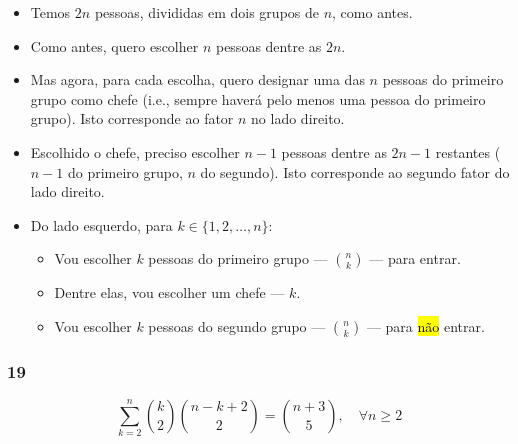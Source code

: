 \documentclass[
  11pt]{report}
\begin{document}
\begin{itemize}
\item
  Temos $2n$ pessoas, divididas em dois grupos de $n$, como antes.
\item
  Como antes, quero escolher $n$ pessoas dentre as $2n$.
\item
  Mas agora, para cada escolha, quero designar uma das $n$ pessoas do primeiro grupo como chefe (i.e., sempre haverá pelo menos uma pessoa do primeiro grupo). Isto corresponde ao fator $n$ no lado direito.
\item
  Escolhido o chefe, preciso escolher $n - 1$ pessoas dentre as $2n - 1$ restantes ($n - 1$ do primeiro grupo, $n$ do segundo). Isto corresponde ao segundo fator do lado direito.
\item
  Do lado esquerdo, para $k \in \{1, 2, \ldots, n \}$:

  \begin{itemize}
  \item
    Vou escolher $k$ pessoas do primeiro grupo --- $\binom{n}{k}$ --- para entrar.
  \item
    Dentre elas, vou escolher um chefe --- $k$.
  \item
    Vou escolher $k$ pessoas do segundo grupo --- $\binom{n}{k}$ --- para {\hl{não}} entrar.
  \end{itemize}
\end{itemize}

\hypertarget{section-3}{%
\subsubsection*{19}\label{section-3}}

\begin{rmdbox}
\[
\sum_{k=2}^n \binom k2 \binom{n-k+2}{2} = \binom{n+3}{5}, \quad \forall n \geq 2
\]

\end{rmdbox}
\end{document}
